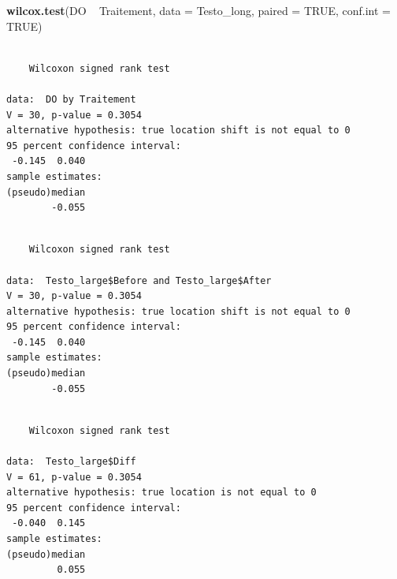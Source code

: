 \documentclass[a4paperpaper,]{article}
\newenvironment{Shaded}{\begin{snugshade}}{\end{snugshade}}
\newcommand{\DataTypeTok}[1]{\textcolor[rgb]{0.00,0.34,0.68}{#1}}
\newcommand{\DecValTok}[1]{\textcolor[rgb]{0.69,0.50,0.00}{#1}}
\newcommand{\KeywordTok}[1]{\textcolor[rgb]{0.12,0.11,0.11}{\textbf{#1}}}
\newcommand{\NormalTok}[1]{\textcolor[rgb]{0.12,0.11,0.11}{#1}}
\newcommand{\OperatorTok}[1]{\textcolor[rgb]{0.12,0.11,0.11}{#1}}
\newcommand{\OtherTok}[1]{\textcolor[rgb]{0.00,0.43,0.16}{#1}}
\newcommand{\StringTok}[1]{\textcolor[rgb]{0.75,0.01,0.01}{#1}}
\begin{document}
\begin{Shaded}
\begin{Highlighting}[]
\KeywordTok{wilcox.test}\NormalTok{(DO }\OperatorTok{~}\StringTok{ }\NormalTok{Traitement, }\DataTypeTok{data =}\NormalTok{ Testo_long, }\DataTypeTok{paired =} \OtherTok{TRUE}\NormalTok{, }\DataTypeTok{conf.int =} \OtherTok{TRUE}\NormalTok{)}
\end{Highlighting}
\end{Shaded}

\begin{verbatim}

    Wilcoxon signed rank test

data:  DO by Traitement
V = 30, p-value = 0.3054
alternative hypothesis: true location shift is not equal to 0
95 percent confidence interval:
 -0.145  0.040
sample estimates:
(pseudo)median 
        -0.055 
\end{verbatim}

\begin{Shaded}
\end{Shaded}

\begin{verbatim}

    Wilcoxon signed rank test

data:  Testo_large$Before and Testo_large$After
V = 30, p-value = 0.3054
alternative hypothesis: true location shift is not equal to 0
95 percent confidence interval:
 -0.145  0.040
sample estimates:
(pseudo)median 
        -0.055 
\end{verbatim}

\begin{Shaded}
\end{Shaded}

\begin{verbatim}

    Wilcoxon signed rank test

data:  Testo_large$Diff
V = 61, p-value = 0.3054
alternative hypothesis: true location is not equal to 0
95 percent confidence interval:
 -0.040  0.145
sample estimates:
(pseudo)median 
         0.055 
\end{verbatim}
\end{document}
